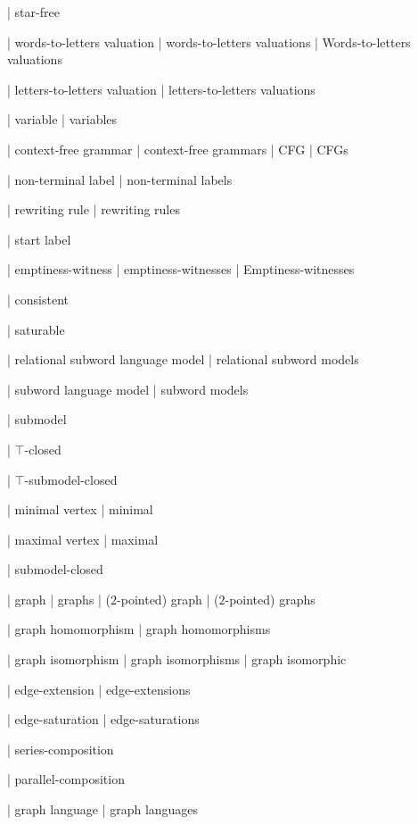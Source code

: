 | star-free

| words-to-letters valuation
| words-to-letters valuations
| Words-to-letters valuations

| letters-to-letters valuation
| letters-to-letters valuations

| variable
| variables


| context-free grammar
| context-free grammars
| CFG
| CFGs

| non-terminal label
| non-terminal labels

| rewriting rule
| rewriting rules

| start label


| emptiness-witness
| emptiness-witnesses
| Emptiness-witnesses

| consistent

| saturable

| relational subword language model
| relational subword models

| subword language model
| subword models


| submodel

| $\top$-closed

| $\top$-submodel-closed

| minimal vertex
| minimal

| maximal vertex
| maximal

| submodel-closed

| graph
| graphs
| ($2$-pointed) graph
| ($2$-pointed) graphs

| graph homomorphism
| graph homomorphisms

| graph isomorphism
| graph isomorphisms
| graph isomorphic

| edge-extension
| edge-extensions

| edge-saturation
| edge-saturations

| series-composition

| parallel-composition

| graph language
| graph languages

